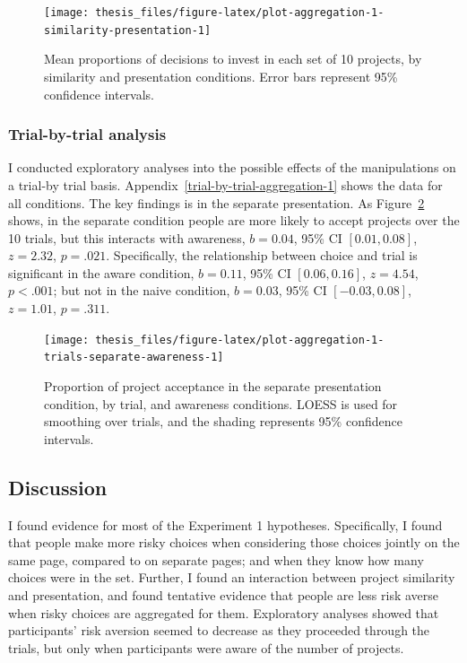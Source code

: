 \documentclass[a4paper, nobind, dvipsnames]{templates/ociamthesis}
\theoremstyle{definition}
\theoremstyle{definition}
\theoremstyle{definition}
\theoremstyle{definition}
\theoremstyle{remark}
\begin{document}
\begin{figure}
\texttt{[image: thesis\_files/figure-latex/plot-aggregation-1-similarity-presentation-1]} \caption{Mean proportions of decisions to invest in each set of 10 projects, by similarity and presentation conditions. Error bars represent 95\% confidence intervals.}\label{fig:plot-aggregation-1-similarity-presentation}
\end{figure}

\hypertarget{trial-by-trial-analysis}{%
\subsubsection{Trial-by-trial analysis}\label{trial-by-trial-analysis}}

I conducted exploratory analyses into the possible effects of the manipulations
on a trial-by trial basis. Appendix~\ref{trial-by-trial-aggregation-1} shows
the data for all conditions. The key findings is in the separate presentation.
As Figure~\ref{fig:plot-aggregation-1-trials-separate-awareness} shows, in the
separate condition people are more likely to accept projects over the 10 trials,
but this interacts with awareness,
\(b = 0.04\), 95\% CI \([0.01, 0.08]\), \(z = 2.32\), \(p = .021\).
Specifically, the relationship between choice and trial is significant in the
aware condition,
\(b = 0.11\), 95\% CI \([0.06, 0.16]\), \(z = 4.54\), \(p < .001\); but not in the
naive condition,
\(b = 0.03\), 95\% CI \([-0.03, 0.08]\), \(z = 1.01\), \(p = .311\).



\begin{figure}
\texttt{[image: thesis\_files/figure-latex/plot-aggregation-1-trials-separate-awareness-1]} \caption{Proportion of project acceptance in the separate presentation condition, by trial, and awareness conditions. LOESS is used for smoothing over trials, and the shading represents 95\% confidence intervals.}\label{fig:plot-aggregation-1-trials-separate-awareness}
\end{figure}

\hypertarget{discussion-aggregation-1}{%
\subsection{Discussion}\label{discussion-aggregation-1}}

I found evidence for most of the Experiment 1 hypotheses. Specifically, I found
that people make more risky choices when considering those choices jointly on
the same page, compared to on separate pages; and when they know how many
choices were in the set. Further, I found an interaction between project
similarity and presentation, and found tentative evidence that people are less
risk averse when risky choices are aggregated for them. Exploratory analyses
showed that participants' risk aversion seemed to decrease as they proceeded
through the trials, but only when participants were aware of the number of
projects.
\end{document}

